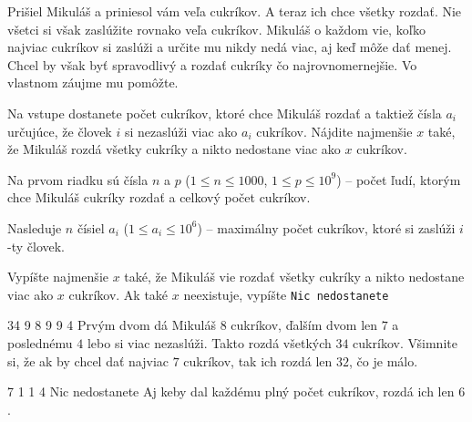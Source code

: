 




Prišiel Mikuláš a priniesol vám veľa cukríkov. A teraz ich chce všetky rozdať. Nie všetci si však
zaslúžite rovnako veľa cukríkov. Mikuláš o každom vie, koľko najviac cukríkov si zaslúži a určite mu
nikdy nedá viac, aj keď môže dať menej. Chcel by však byť spravodlivý a rozdať cukríky čo
najrovnomernejšie. Vo vlastnom záujme mu pomôžte.


Na vstupe dostanete počet cukríkov, ktoré chce Mikuláš rozdať a taktiež čísla $a_i$ určujúce, že
človek $i$ si nezaslúži viac ako $a_i$ cukríkov. Nájdite najmenšie $x$ také, že Mikuláš rozdá všetky
cukríky a nikto nedostane viac ako $x$ cukríkov.


Na prvom riadku sú čísla $n$ a $p$ ($1 \leq n \leq 1000$, $1 \leq p \leq 10^9$) -- počet ľudí,
ktorým chce Mikuláš cukríky rozdať a celkový počet cukríkov.

Nasleduje $n$ čísiel $a_i$ ($1 \leq a_i \leq 10^6$) -- maximálny počet cukríkov, ktoré si zaslúži
$i$-ty človek.


Vypíšte najmenšie $x$ také, že Mikuláš vie rozdať všetky cukríky a nikto nedostane viac ako $x$
cukríkov. Ak také $x$ neexistuje, vypíšte \texttt{Nic nedostanete}


 34
9 8 9 9 4
\komentar
Prvým dvom dá Mikuláš $8$ cukríkov, ďalším dvom len $7$ a poslednému $4$ lebo si viac nezaslúži.
Takto rozdá všetkých $34$ cukríkov. Všimnite si, že ak by chcel dať najviac $7$ cukríkov, tak ich
rozdá len $32$, čo je málo.
\koniec

 7
1 1 4
\vystup
Nic nedostanete
\komentar
Aj keby dal každému plný počet cukríkov, rozdá ich len $6$.
\koniec


